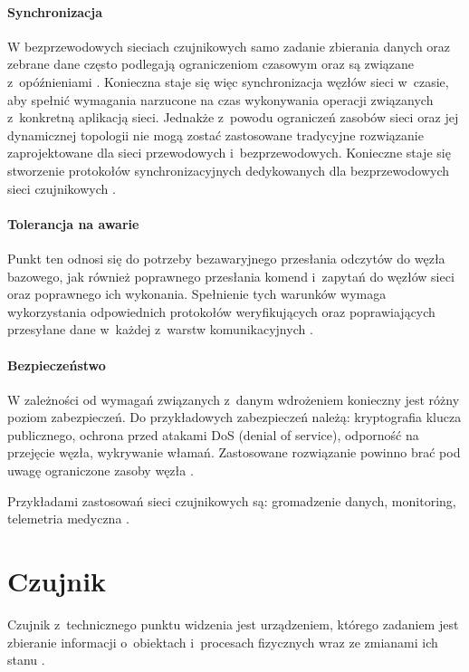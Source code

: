 \paragraph{Synchronizacja}
W bezprzewodowych sieciach czujnikowych samo zadanie zbierania danych oraz zebrane dane często podlegają ograniczeniom czasowym oraz są związane z~opóźnieniami \cite{Alnuaimi2011}. Konieczna staje się więc synchronizacja węzłów sieci w~czasie, aby spełnić wymagania narzucone na czas wykonywania operacji związanych z~konkretną aplikacją sieci. Jednakże z~powodu ograniczeń zasobów sieci oraz jej dynamicznej topologii nie mogą zostać zastosowane tradycyjne rozwiązanie zaprojektowane dla sieci przewodowych i~bezprzewodowych. Konieczne staje się stworzenie protokołów synchronizacyjnych dedykowanych dla bezprzewodowych sieci czujnikowych \cite{Howitt2006}.

\paragraph{Tolerancja na awarie}
Punkt ten odnosi się do potrzeby bezawaryjnego przesłania odczytów do węzła bazowego, jak również poprawnego przesłania komend i~zapytań do węzłów sieci oraz poprawnego ich wykonania. Spełnienie tych warunków wymaga wykorzystania odpowiednich protokołów weryfikujących oraz poprawiających przesyłane dane w~każdej z~warstw komunikacyjnych \cite{Kakamanshadi2015}.

\paragraph{Bezpieczeństwo}
W zależności od wymagań związanych z~danym wdrożeniem konieczny jest różny poziom zabezpieczeń. Do przykładowych zabezpieczeń należą: kryptografia klucza publicznego, ochrona przed atakami DoS (denial of service), odporność na przejęcie węzła, wykrywanie włamań. Zastosowane rozwiązanie powinno brać pod uwagę ograniczone zasoby węzła \cite{Pathan2010}.

\bigskip

Przykładami zastosowań sieci czujnikowych są: gromadzenie danych, monitoring, telemetria medyczna \cite{Biradar2009}.

\section{Czujnik}
Czujnik z~technicznego punktu widzenia jest urządzeniem, którego zadaniem jest zbieranie informacji o~obiektach i~procesach fizycznych wraz ze zmianami ich stanu \cite{Dargie2010}.

